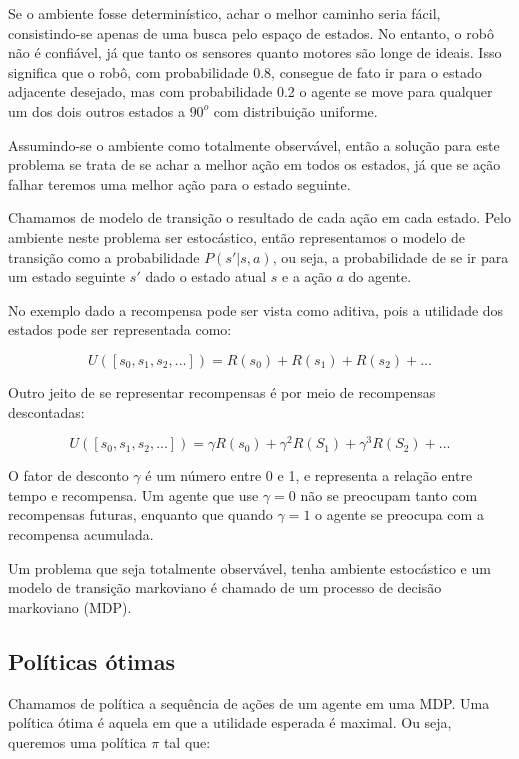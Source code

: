 \documentclass[a4paper,10pt]{article}
\theoremstyle{plain}
\begin{document}
Se o ambiente fosse determinístico, achar o melhor caminho seria fácil, consistindo-se apenas de
uma busca pelo espaço de estados. No entanto, o robô não é confiável, já que tanto os sensores
quanto motores são longe de ideais. Isso significa que o robô, com probabilidade 0.8, consegue de
fato ir para o estado adjacente desejado, mas com probabilidade 0.2 o agente se move para qualquer
um dos dois outros estados a $90^o$ com distribuição uniforme.

Assumindo-se o ambiente como totalmente observável, então a solução para este problema se trata de
se achar a melhor ação em todos os estados, já que se ação falhar teremos uma melhor ação para o
estado seguinte.

Chamamos de modelo de transição o resultado de cada ação em cada estado. Pelo ambiente neste
problema ser estocástico, então representamos o modelo de transição como a probabilidade
$P(s'|s,a)$, ou seja, a probabilidade de se ir para um estado seguinte $s'$ dado o estado atual $s$
e a ação $a$ do agente.

No exemplo dado a recompensa pode ser vista como aditiva, pois a utilidade dos estados pode ser
representada como:

\begin{equation*}
  U([s_0,s_1,s_2,...]) = R(s_0) + R(s_1) + R(s_2) + ...
\end{equation*}

Outro jeito de se representar recompensas é por meio de recompensas descontadas:

\begin{equation*}
  U([s_0,s_1,s_2,...]) = \gamma R(s_0) + \gamma^2 R(S_1) + \gamma^3 R(S_2) + ...
\end{equation*}

O fator de desconto $\gamma$ é um número entre 0 e 1, e representa a relação entre tempo e
recompensa. Um agente que use $\gamma = 0$ não se preocupam tanto com recompensas futuras, enquanto
que quando $\gamma = 1$ o agente se preocupa com a recompensa acumulada.

Um problema que seja totalmente observável, tenha ambiente estocástico e um modelo de transição
markoviano é chamado de um processo de decisão markoviano (MDP).

\subsection{Políticas ótimas}

Chamamos de política a sequência de ações de um agente em uma MDP. Uma política ótima é aquela em
que a utilidade esperada é maximal. Ou seja, queremos uma política $\pi$ tal que:
\end{document}
